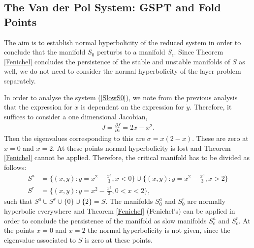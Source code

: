 \subsection{The Van der Pol System: GSPT and Fold Points}\label{VDPfolds}
The aim is to establish normal hyperbolicity of the reduced system in order to conclude that the manifold $S_0$ perturbs to a manifold $S_\epsilon$. Since Theorem \ref{Fenichel} concludes the persistence of the stable and unstable manifolds of $S$ as well, we do not need to consider the normal hyperbolicity of the layer problem separately. 

In order to analyse the system (\ref{SlowS0}), we note from the previous analysis that the expression for $\dot{x}$ is dependent on the expression for $\dot{y}$. Therefore, it suffices to consider a one dimensional Jacobian,
\begin{align*}
J= \frac{\partial f}{\partial x} = 2x - x^2.
\end{align*}
Then the eigenvalues corresponding to this are $\sigma = x(2-x)$. These are zero at $x=0$ and $x=2$. At these points normal hyperbolicity is lost and Theorem \ref{Fenichel} cannot be applied.
Therefore, the critical manifold has to be divided as follows:
\begin{align*}
S^a &=\bigg \lbrace (x,y): y = x^2-\frac{x^3}{3}, x< 0 \bigg \rbrace \cup \bigg \lbrace (x,y): y = x^2-\frac{x^3}{3}, x>2 \bigg\rbrace \\
S^r &= \bigg\lbrace (x,y): y = x^2-\frac{x^3}{3}, 0< x< 2 \bigg\rbrace,
\end{align*}
such that $S^a \cup S^r \cup \{0\} \cup \{2\} = S$.
The manifolds $S^a_0$ and $S^r_0$ are normally hyperbolic everywhere and  Theorem \ref{Fenichel} (Fenichel's) can be applied in order to conclude the persistence of the manifold as slow manifolds $S^a_\epsilon$ and $S^r_\epsilon$. At the points $x=0$ and $x=2$ the normal hyperbolicity is not given, since the eigenvalue associated to $S$ is zero at these points.

